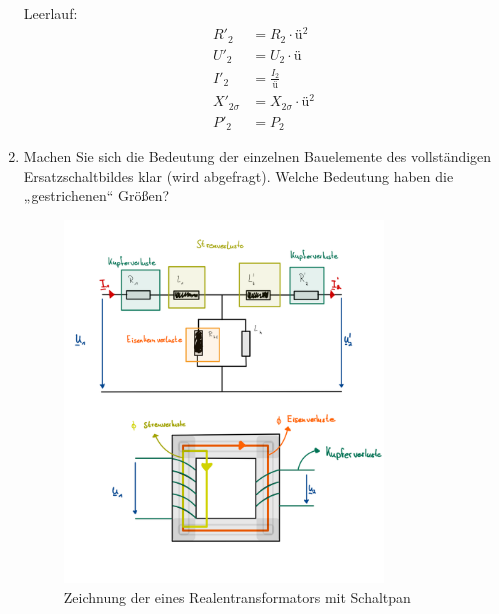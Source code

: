 \begin{enumerate}[label=\alph*)]
\begin{minipage}{0.5\textwidth}
        \end{minipage}\hfill
        \begin{minipage}{0.5\textwidth}
          Leerlauf:
          \begin{align*}
            R'_2         & =R_2\cdot ü^2           \\
            U'_2         & =U_2\cdot ü             \\
            I'_2         & = \frac{I_2}{ü}         \\
            X'_{2\sigma} & = X_{2\sigma} \cdot ü^2 \\
            P'_2         & = P_2
          \end{align*}
        \end{minipage}

        \pagebreak
  \item Machen Sie sich die Bedeutung der einzelnen Bauelemente des vollständigen
        Ersatzschaltbildes klar (wird abgefragt). Welche Bedeutung haben die
        „gestrichenen“ Größen?
        \begin{figure}[h!]
          \begin{center}
            \includegraphics[width=0.8\textwidth]{img/2.1.2.4.png}
          \end{center}
          \caption{Zeichnung der eines Realentransformators mit Schaltpan }\label{img/2.1.2.4}
        \end{figure}
        \\

\end{enumerate}
